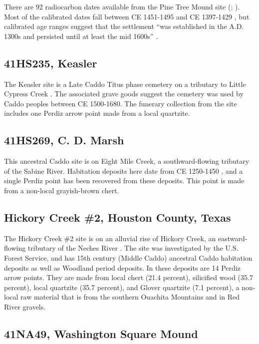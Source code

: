 \documentclass[review]{elsarticle}
\begin{document}
There are 92 radiocarbon dates available from the Pine Tree Mound site  (\citealp[Table 4.13]{RN5724}; \citealp[Table 2]{RN2944}). Most of the calibrated dates fall between CE 1451-1495 and CE 1397-1429 \citep[Table 3]{RN2944}, but calibrated age ranges suggest that the settlement “was established in the A.D. 1300s and persisted until at least the mid 1600s” \citep[299]{RN5724}.

\subsection*{41HS235, Keasler}

The Keasler site is a Late Caddo Titus phase cemetery on a tributary to Little Cypress Creek \citep{RN8983}. The associated grave goods suggest the cemetery was used by Caddo peoples between CE 1500-1680. The funerary collection from the site includes one Perdiz arrow point made from a local quartzite.

\subsection*{41HS269, C. D. Marsh}

This ancestral Caddo site is on Eight Mile Creek, a southward-flowing tributary of the Sabine River. Habitation deposits here date from CE 1250-1450 \citep{RN1536}, and a single Perdiz point has been recovered from these deposits. This point is made from a non-local grayish-brown chert.

\subsection*{Hickory Creek \#2, Houston County, Texas}

The Hickory Creek \#2 site is on an alluvial rise of Hickory Creek, an eastward-flowing tributary of the Neches River \citep{RN2347}. The site was investigated by the U.S. Forest Service, and has 15th century (Middle Caddo) ancestral Caddo habitation deposits as well as Woodland period deposits. In these deposits are 14 Perdiz arrow points. They are made from local chert (21.4 percent), silicified wood (35.7 percent), local quartzite (35.7 percent), and Glover quartzite (7.1 percent), a non-local raw material that is from the southern Ouachita Mountains and in Red River gravels.

\subsection*{41NA49, Washington Square Mound}
\end{document}
